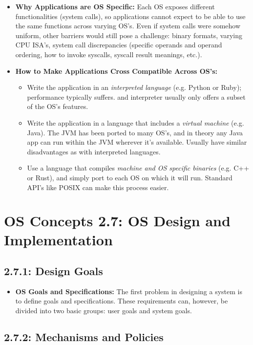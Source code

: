 \documentclass[12pt]{article}
\begin{document}
\begin{itemize}
    \item \textbf{Why Applications are OS Specific:} Each OS exposes different functionalities (system calls), so applications cannot expect to be able to use the same functions across varying OS's. Even if system calls were somehow uniform, other barriers would still pose a challenge: binary formats, varying CPU ISA's, system call discrepancies (specific operands and operand ordering, how to invoke syscalls, syscall result meanings, etc.).
    \item \textbf{How to Make Applications Cross Compatible Across OS's:}
    \begin{itemize}
        \item Write the application in an \textit{interpreted language} (e.g. Python or Ruby); performance typically suffers. and interpreter usually only offers a subset of the OS's features.
        \item Write the application in a language that includes a \textit{virtual machine} (e.g. Java). The JVM has been ported to many OS's, and in theory any Java app can run within the JVM wherever it's available. Usually have similar disadvantages as with interpreted languages.
        \item Use a language that compiles \textit{machine and OS specific binaries} (e.g. C++ or Rust), and simply port to each OS on which it will run. Standard API's like POSIX can make this process easier.
    \end{itemize}
\end{itemize}

\section*{OS Concepts 2.7: OS Design and Implementation}

\subsection*{2.7.1: Design Goals}

\begin{itemize}
    \item \textbf{OS Goals and Specifications:} The first problem in designing a system is to define goals and specifications. These requirements can, however, be divided into two basic groups: user goals and system goals.
\end{itemize}

\subsection*{2.7.2: Mechanisms and Policies}
\end{document}
